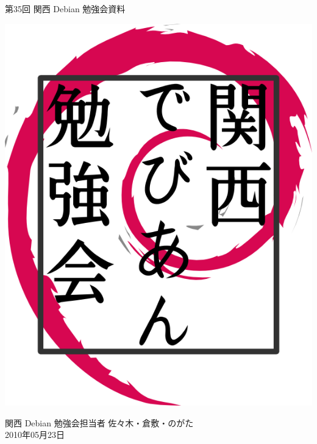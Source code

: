 \documentclass[mingoth,a4paper]{jsarticle}
\newcommand{\debmtgyear}{2010}
\newcommand{\debmtgdate}{23}
\newcommand{\debmtgmonth}{05}
\newcommand{\debmtgnumber}{35}
\begin{document}
\begin{titlepage}


 第\debmtgnumber{}回 関西 Debian 勉強会資料

\vspace{2cm}

\begin{center}
\includegraphics{image200802/kansaidebianlogo.png}
\end{center}

\begin{flushright}
\hfill{}関西 Debian 勉強会担当者 佐々木・倉敷・のがた \\
\hfill{}\debmtgyear{}年\debmtgmonth{}月\debmtgdate{}日
\end{flushright}

\thispagestyle{empty}
\end{titlepage}


\subsection*{}%
 
\end{document}
